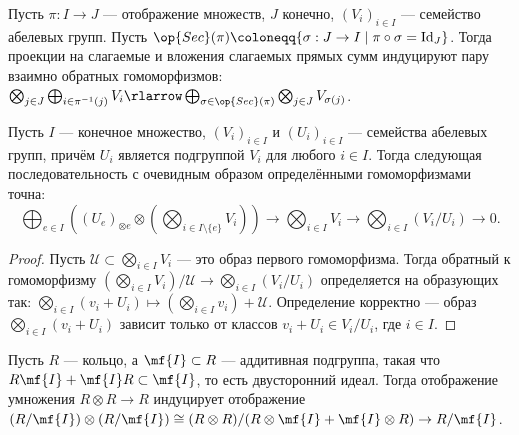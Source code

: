 \documentclass[
	extrafontsizes,
	11pt,
	hyphens,
]{memoir}
\begin{document}
\begin{statement} \label{sta:TensorDistr}
Пусть \(\pi : I \to J\) --- отображение множеств, \(J\) конечно, \((V_i)_{i \in I}\) --- семейство абелевых групп.
Пусть \(\op{Sec}(\pi) \coloneqq \{\sigma : J \to I \mid \pi \circ \sigma = \mathrm{Id}_J\}\).
Тогда проекции на слагаемые и вложения слагаемых прямых сумм индуцируют пару взаимно обратных гомоморфизмов:
\(
\bigotimes_{j \in J}
	\bigoplus_{i \in \pi^{-1}(j)}
		V_i
\rlarrow
\bigoplus_{\sigma \in \op{Sec}(\pi)}
	\bigotimes_{j \in J}
		V_{\sigma(j)}
\).
\end{statement}

\begin{statement} \label{sta:TensorRightExact}
Пусть \(I\) --- конечное множество, \((V_i)_{i \in I}\) и \((U_i)_{i \in I}\) --- семейства абелевых групп, причём \(U_i\) является подгруппой \(V_i\) для любого \(i \in I\).
Тогда следующая последовательность с очевидным образом определёнными гомоморфизмами точна:
\[
\textstyle
\bigoplus_{e \in I} ((U_e)_{\otimes e} \otimes (\bigotimes_{i \in I \setminus \{e\}} V_i))
\to
\bigotimes_{i \in I} V_i
\to
\bigotimes_{i \in I} (V_i / U_i)
\to
0.
\]
\end{statement}

\begin{proof}
Пусть \(\mathcal{U} \subset \bigotimes_{i \in I} V_i\) --- это образ первого гомоморфизма.
Тогда обратный к гомоморфизму
\((\bigotimes_{i \in I} V_i) / \mathcal{U} \to \bigotimes_{i \in I} (V_i / U_i)\)
определяется на образующих так:
\(
\bigotimes_{i \in I} (v_i + U_i)
\mapsto
(\bigotimes_{i \in I} v_i) + \mathcal{U}
\).
Определение корректно --- образ
\(\bigotimes_{i \in I} (v_i + U_i)\) зависит только от классов \(v_i + U_i \in V_i/U_i\), где \(i \in I\).
\end{proof}

\begin{example}
Пусть \(R\) --- кольцо, а \(\mf{I} \subset R\) --- аддитивная подгруппа, такая что \(R\mf{I} + \mf{I}R \subset \mf{I}\), то есть двусторонний идеал. Тогда отображение умножения \(R \otimes R \to R\) индуцирует отображение \((R/\mf{I}) \otimes (R/\mf{I}) \cong (R \otimes R) / (R \otimes \mf{I} + \mf{I} \otimes R) \to R/\mf{I}\).
\end{example}
\end{document}
